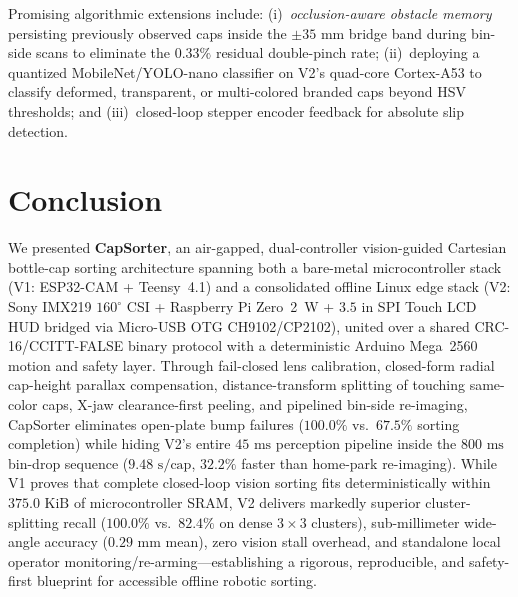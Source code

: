 \documentclass[10pt,twocolumn,letterpaper]{article}
\begin{document}
Promising algorithmic extensions include: (i)~\emph{occlusion-aware obstacle memory} persisting previously observed caps inside the $\pm 35\text{ mm}$ bridge band during bin-side scans to eliminate the $0.33\%$ residual double-pinch rate; (ii)~deploying a quantized MobileNet/YOLO-nano classifier on V2's quad-core Cortex-A53 to classify deformed, transparent, or multi-colored branded caps beyond HSV thresholds; and (iii)~closed-loop stepper encoder feedback for absolute slip detection.

\section{Conclusion}
\label{sec:conclusion}

We presented \textbf{CapSorter}, an air-gapped, dual-controller vision-guided Cartesian bottle-cap sorting architecture spanning both a bare-metal microcontroller stack (V1: ESP32-CAM + Teensy~4.1) and a consolidated offline Linux edge stack (V2: Sony IMX219 $160^\circ$ CSI + Raspberry Pi Zero~2~W + $3.5\text{ in}$ SPI Touch LCD HUD bridged via Micro-USB OTG CH9102/CP2102), united over a shared CRC-16/CCITT-FALSE binary protocol with a deterministic Arduino Mega~2560 motion and safety layer. Through fail-closed lens calibration, closed-form radial cap-height parallax compensation, distance-transform splitting of touching same-color caps, X-jaw clearance-first peeling, and pipelined bin-side re-imaging, CapSorter eliminates open-plate bump failures ($100.0\%$ vs.\ $67.5\%$ sorting completion) while hiding V2's entire $45\text{ ms}$ perception pipeline inside the $800\text{ ms}$ bin-drop sequence ($9.48\text{ s/cap}$, $32.2\%$ faster than home-park re-imaging). While V1 proves that complete closed-loop vision sorting fits deterministically within $375.0\text{ KiB}$ of microcontroller SRAM, V2 delivers markedly superior cluster-splitting recall ($100.0\%$ vs.\ $82.4\%$ on dense $3\times 3$ clusters), sub-millimeter wide-angle accuracy ($0.29\text{ mm}$ mean), zero vision stall overhead, and standalone local operator monitoring/re-arming—establishing a rigorous, reproducible, and safety-first blueprint for accessible offline robotic sorting.

{
  \small
  
  
}

\clearpage
\appendix
\onecolumn
\end{document}
